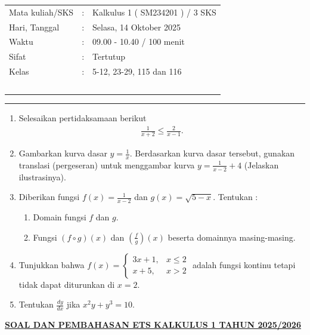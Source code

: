 \documentclass[10pt,openany,a4paper]{article}
\theoremstyle{definition}
\theoremstyle{definition}
\theoremstyle{plain}
\begin{document}
    \begin{center}
	\begin{tabular}{lcl}
		Mata kuliah/SKS & : & Kalkulus 1 ( SM234201 ) / 3 SKS\\
		Hari, Tanggal & : & Selasa, 14 Oktober 2025\\
		Waktu & : & 09.00 - 10.40 / 100 menit\\
		Sifat & : & Tertutup\\
		Kelas & : & 5-12, 23-29, 115 dan 116\\
  ~
	\end{tabular}
    
    \noindent\rule{\textwidth}{2.pt}
        \end{center}
        \begin{enumerate}
            \item Selesaikan pertidaksamaan berikut 
            \begin{align*}
                \frac{1}{x+2} \leq \frac{2}{x-1}.
            \end{align*}
            \item Gambarkan kurva dasar $y=\frac{1}{x}$. Berdasarkan kurva dasar tersebut, gunakan translasi (pergeseran) untuk menggambar kurva $y=\frac{1}{x-2}+4$ (Jelaskan ilustrasinya).
            \item Diberikan fungsi $f(x)=\frac{1}{x-2}$ dan $g(x)=\sqrt{5-x}$. Tentukan :
            \begin{enumerate}
                \item Domain fungsi $f$ dan $g$.
                \item Fungsi $(f\circ g)(x)$ dan $\left(\frac{f}{g}\right) (x)$ beserta domainnya masing-masing. 
            \end{enumerate}
            \item Tunjukkan bahwa $f(x)=\begin{cases}
                3x+1, &x\leq 2\\
                x+5, &x>2
            \end{cases}$ adalah fungsi kontinu tetapi tidak dapat diturunkan di $x=2$.
            \item Tentukan $\frac{dy}{dx}$ jika $x^2y+y^3=10$.
        \end{enumerate}
               \newpage
 \begin{center}
	{\underline{\textbf{\MakeUppercase{Soal dan Pembahasan ETS Kalkulus 1 Tahun 2025/2026}}}}
    \end{center}
\end{document}
